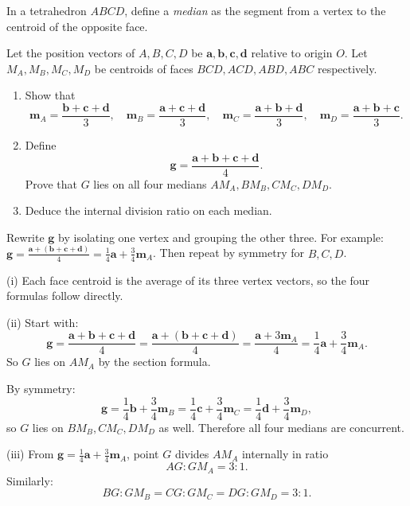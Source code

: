 \vspace{1em}

\begin{problem}
In a tetrahedron $ABCD$, define a \emph{median} as the segment from a vertex to the centroid of the opposite face.

Let the position vectors of $A,B,C,D$ be $\mathbf{a},\mathbf{b},\mathbf{c},\mathbf{d}$ relative to origin $O$.
Let $M_A, M_B, M_C, M_D$ be centroids of faces $BCD, ACD, ABD, ABC$ respectively.

\begin{enumerate}[label=(\roman*)]
    \item Show that
    \[
    \mathbf{m}_A=\frac{\mathbf{b}+\mathbf{c}+\mathbf{d}}{3},
    \quad
    \mathbf{m}_B=\frac{\mathbf{a}+\mathbf{c}+\mathbf{d}}{3},
    \quad
    \mathbf{m}_C=\frac{\mathbf{a}+\mathbf{b}+\mathbf{d}}{3},
    \quad
    \mathbf{m}_D=\frac{\mathbf{a}+\mathbf{b}+\mathbf{c}}{3}.
    \]
    \item Define
    \[
    \mathbf{g}=\frac{\mathbf{a}+\mathbf{b}+\mathbf{c}+\mathbf{d}}{4}.
    \]
    Prove that $G$ lies on all four medians $AM_A, BM_B, CM_C, DM_D$.
    \item Deduce the internal division ratio on each median.
\end{enumerate}
\end{problem}

\begin{hint}
Rewrite $\mathbf{g}$ by isolating one vertex and grouping the other three. For example:
$\mathbf{g}=\frac{\mathbf{a}+(\mathbf{b}+\mathbf{c}+\mathbf{d})}{4}
=\frac{1}{4}\mathbf{a}+\frac{3}{4}\mathbf{m}_A$.
Then repeat by symmetry for $B,C,D$.
\end{hint}

\begin{solution}[Sketch]
(i) Each face centroid is the average of its three vertex vectors, so the four formulas follow directly.

(ii) Start with:
\[
\mathbf{g}=\frac{\mathbf{a}+\mathbf{b}+\mathbf{c}+\mathbf{d}}{4}
=\frac{\mathbf{a}+(\mathbf{b}+\mathbf{c}+\mathbf{d})}{4}
=\frac{\mathbf{a}+3\mathbf{m}_A}{4}
=\frac{1}{4}\mathbf{a}+\frac{3}{4}\mathbf{m}_A.
\]
So $G$ lies on $AM_A$ by the section formula.

By symmetry:
\[
\mathbf{g}=\frac{1}{4}\mathbf{b}+\frac{3}{4}\mathbf{m}_B
=\frac{1}{4}\mathbf{c}+\frac{3}{4}\mathbf{m}_C
=\frac{1}{4}\mathbf{d}+\frac{3}{4}\mathbf{m}_D,
\]
so $G$ lies on $BM_B, CM_C, DM_D$ as well. Therefore all four medians are concurrent.

(iii) From $\mathbf{g}=\frac{1}{4}\mathbf{a}+\frac{3}{4}\mathbf{m}_A$, point $G$ divides $AM_A$ internally in ratio
\[
AG:GM_A=3:1.
\]
Similarly:
\[
BG:GM_B=CG:GM_C=DG:GM_D=3:1.
\]
\end{solution}


